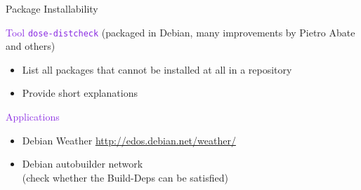 \documentclass[xcolor={dvipsnames}]{beamer}
\newcommand{\EEE}[1]{\textcolor{BlueViolet}{#1}}
\begin{document}
\begin{frame}{Package Installability}

\EEE{Tool \texttt{dose-distcheck}} (packaged in Debian, many
improvements by Pietro Abate and others)
\begin{itemize}
\item List all packages that cannot be installed at all in a repository
\item Provide short explanations
\end{itemize}

\vspace{1em}

\EEE{Applications}
\begin{itemize}
\item
Debian Weather \hspace{3em}
\url{http://edos.debian.net/weather/}
\begin{center}
\end{center}
\item
Debian autobuilder network \\
(check whether the Build-Deps can be satisfied)
\end{itemize}

\end{frame}
\end{document}
